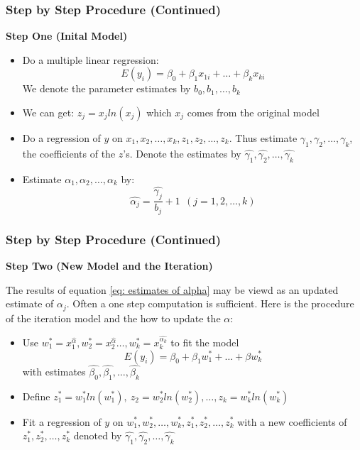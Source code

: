 \documentclass[10pt,aspectratio=32]{beamer}
\begin{document}
\begin{frame}
	\frametitle{Step by Step Procedure (Continued)}
\textbf{Step One (Inital Model)}
\begin{itemize}
	\item Do a multiple linear regression: $$E(y_i) = \beta_0 + \beta_1 x_{1i} + \dots + \beta_k x_{ki}$$
	We denote the parameter estimates by $b_0, b_1, \dots, b_k$
	\item We can get: $z_j = x_j ln(x_j)$ which $x_j$ comes from the original model
	\item Do a regression of $y$ on $x_1, x_2, \dots, x_k, z_1, z_2, \dots, z_k$. Thus estimate $\gamma_1, \gamma_2, \dots, \gamma_k$, the coefficients of the $z$'s. Denote the estimates by $\hat{\gamma_1}, \hat{\gamma_2}, \dots, \hat{\gamma_k}$
	\item Estimate $\alpha_1, \alpha_2, \dots, \alpha_k$ by:
	$$\hat{\alpha_j} = \frac{\hat{\gamma_j}}{b_j} + 1 \ \ (j = 1, 2, \dots, k)\label{eq: estimates of alpha}$$
\end{itemize}
\end{frame}

\begin{frame}
 	\frametitle{Step by Step Procedure (Continued)}
 \textbf{Step Two (New Model and the Iteration)}

The results of equation \ref{eq: estimates of alpha} may be viewd as an updated estimate of $\alpha_j$. Often a one step computation is sufficient. Here is the procedure of the iteration model and the how to update the $\alpha$:

\begin{itemize}
	\item Use $w_1^* = x_1^{\hat{\alpha}}, w_2^* = x_2^{\hat{\alpha}} \dots, w_k^* = x_k^{\hat{\alpha_k}}$ to fit the model $$E(y_i) = \beta_0 + \beta_1 w_1^* + \dots + \beta w_k^*$$ with estimates $\hat{\beta_0}, \hat{\beta_1}, \dots, \hat{\beta_k}$
	\item Define $z_1^* = w_1^* ln(w_1^*), \ z_2 = w_2^* ln(w_2^*), \dots  ,z_k =w_k^* ln(w_k^*)$
	\item Fit a regression of $y$ on $w_1^*, w_2^*, \dots, w_k^*, z_1^*, z_2^*, \dots, z_k^*$ with a new coefficients of $z_1^*, z_2^*, \dots, z_k^*$ denoted by $\hat{\gamma_1}, \hat{\gamma_2}, \dots, \hat{\gamma_k}$
\end{itemize}

\end{frame}
\end{document}
